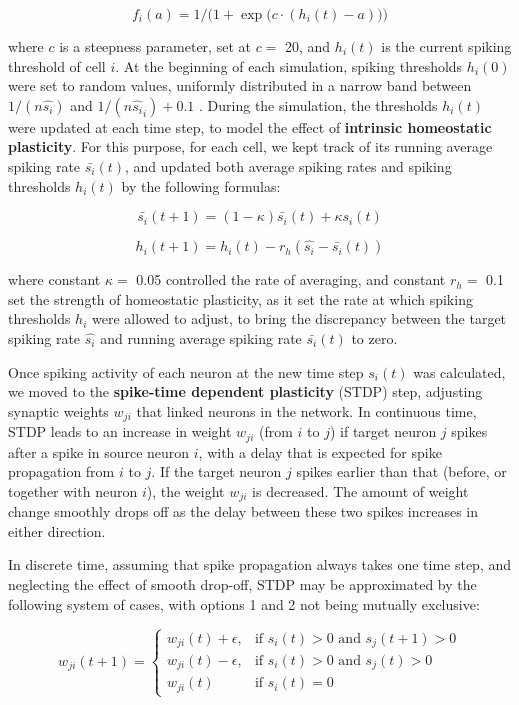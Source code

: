 \documentclass{article}
\begin{document}
\[ f_i(a) = 1/\Big(1+\exp\big(c\cdot(h_i(t)-a)\big)\Big) \]

where $c$ is a steepness parameter, set at $c=$ 20, and $h_i(t)$ is the current spiking threshold of cell $i$. At the beginning of each simulation, spiking thresholds $h_i(0)$ were set to random values, uniformly distributed in a narrow band between $1/(n \hat{s_i})$ and $1/(n \hat{s_i}_i)+0.1$ . During the simulation, the thresholds $h_i(t)$ were updated at each time step, to model the effect of \textbf{intrinsic homeostatic plasticity}. For this purpose, for each cell, we kept track of its running average spiking rate $\bar{s_i}(t)$, and updated both average spiking rates and spiking thresholds $h_i(t)$ by the following formulas:

\[ \bar{s_i}(t+1) = (1-\kappa)\bar{s_i}(t) + \kappa s_i(t) \]

\[ h_i(t+1) = h_i(t) - r_h(\hat{s_i} - \bar{s_i}(t)) \]

where constant $\kappa=$ 0.05 controlled the rate of averaging, and constant $r_h=$ 0.1 set the strength of homeostatic plasticity, as it set the rate at which spiking thresholds $h_i$ were allowed to adjust, to bring the discrepancy between the target spiking rate $\hat{s_i}$ and running average spiking rate $\bar{s_i}(t)$ to zero.

Once spiking activity of each neuron at the new time step $s_i(t)$ was calculated, we moved to the \textbf{spike-time dependent plasticity} (STDP) step, adjusting synaptic weights $w_{ji}$ that linked neurons in the network. In continuous time, STDP leads to an increase in weight $w_{ji}$ (from $i$ to $j$) if target neuron $j$ spikes after a spike in source neuron $i$, with a delay that is expected for spike  propagation from $i$ to $j$. If the target neuron $j$ spikes earlier than that (before, or together with neuron $i$), the weight $w_{ji}$ is decreased. The amount of weight change smoothly drops off as the delay between these two spikes increases in either direction. 

In discrete time, assuming that spike propagation always takes one time step, and neglecting the effect of smooth drop-off, STDP may be approximated by the following system of cases, with options 1 and 2 not being mutually exclusive:

\[ w_{ji}(t+1) = \left \{ \begin{array}{lll} w_{ji}(t)+\epsilon, & \text{if } s_i(t)> 0 \text{ and } s_j(t+1)> 0 \\ w_{ji}(t)-\epsilon, & \text{if } s_i(t)> 0 \text{ and } s_j(t)> 0 \\ w_{ji}(t) & \text{if } s_i(t)=0\end{array} \right. \]
\end{document}
